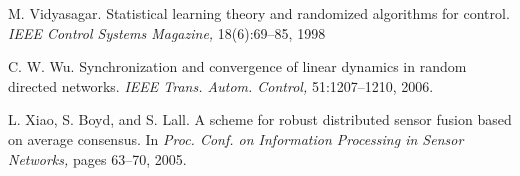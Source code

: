 \documentclass[12pt]{article}
\begin{document}
\begin{thebibliography}{30}
		
		 M. Vidyasagar. Statistical learning theory and randomized algorithms for control. \textit{IEEE Control Systems Magazine,} 18(6):69–85, 1998
		
		
		 C. W. Wu. Synchronization and convergence of linear dynamics in random directed networks. \textit{IEEE Trans. Autom. Control,} 51:1207–1210, 2006.
		
		
		 L. Xiao, S. Boyd, and S. Lall. A scheme for robust distributed sensor fusion based on average consensus. In \textit{Proc. Conf. on Information Processing in Sensor Networks,} pages 63–70, 2005.
		
	\end{thebibliography}
	
	
\end{document}
